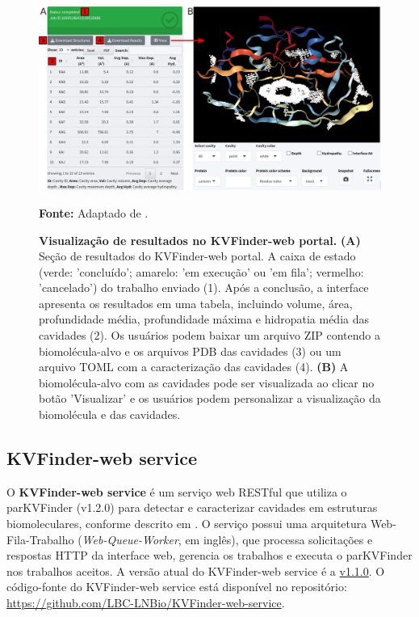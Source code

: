 \documentclass[Portugues]{phdquali}
\begin{document}
\begin{figure}[h]
  \centering
  \includegraphics[scale=1.8]{images/kvweb-results.png}
  \centerline{\scriptsize{\textbf{Fonte:} Adaptado de \cite{guerra2023A}.}}
  \caption[Visualização de resultados no KVFinder-web portal]{\textbf{Visualização de resultados no KVFinder-web portal.} \textbf{(A)} Seção de resultados do KVFinder-web portal. A caixa de estado (verde: 'concluído'; amarelo: 'em execução' ou 'em fila'; vermelho: 'cancelado') do trabalho enviado (1). Após a conclusão, a interface apresenta os resultados em uma tabela, incluindo volume, área, profundidade média, profundidade máxima e hidropatia média das cavidades (2). Os usuários podem baixar um arquivo ZIP contendo a biomolécula-alvo e os arquivos PDB das cavidades (3) ou um arquivo TOML com a caracterização das cavidades (4). \textbf{(B)} A biomolécula-alvo com as cavidades pode ser visualizada ao clicar no botão 'Visualizar' e os usuários podem personalizar a visualização da biomolécula e das cavidades.}
  \label{fig:kvweb-results}
\end{figure}

\subsection{KVFinder-web service}

O \textbf{KVFinder-web service} é um serviço web RESTful que utiliza o parKVFinder (v1.2.0) para detectar e caracterizar cavidades em estruturas biomoleculares, conforme descrito em \cite{guerra2019,guerra2020,guerra2023A}. O serviço possui uma arquitetura Web-Fila-Trabalho (\textit{Web-Queue-Worker}, em inglês), que processa solicitações e respostas HTTP da interface web, gerencia os trabalhos e executa o parKVFinder nos trabalhos aceitos. A versão atual do KVFinder-web service é a \href{https://github.com/LBC-LNBio/KVFinder-web-service/tree/v1.1.0}{v1.1.0}. O código-fonte do KVFinder-web service está disponível no repositório: \url{https://github.com/LBC-LNBio/KVFinder-web-service}.
\end{document}
